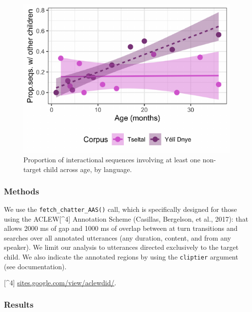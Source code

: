 \documentclass[10pt, letterpaper]{article}
\newenvironment{CodeChunk}{}{}
\begin{document}
\begin{CodeChunk}
\begin{figure}[h!]

{\centering \includegraphics{figs/tseyel.is.fig-1} 

}

\caption[Proportion of interactional sequences involving at least one non-target child across age, by language]{Proportion of interactional sequences involving at least one non-target child across age, by language.}\label{fig:tseyel.is.fig}
\end{figure}
\end{CodeChunk}

\hypertarget{methods}{%
\subsubsection{Methods}\label{methods}}

We use the \texttt{fetch\_chatter\_AAS()} call, which is specifically
designed for those using the ACLEW{[}\^{}4{]} Annotation Scheme
(Casillas, Bergelson, et al., 2017): that allows 2000 ms of gap and 1000
ms of overlap between at turn transitions and searches over all
annotated utterances (any duration, content, and from any speaker). We
limit our analysis to utterances directed exclusively to the target
child. We also indicate the annotated regions by using the
\texttt{cliptier} argument (see documentation).

{[}\^{}4{]}
\href{https://sites.google.com/view/aclewdid/home}{sites.google.com/view/aclewdid/}.

\hypertarget{results}{%
\subsubsection{Results}\label{results}}
\end{document}
